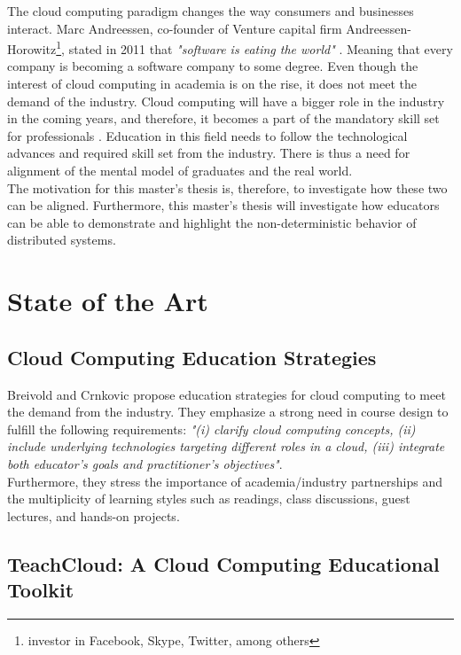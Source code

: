 The cloud computing paradigm changes the way consumers and businesses interact. Marc Andreessen, co-founder of Venture capital firm Andreessen-Horowitz\footnote{investor in Facebook, Skype, Twitter, among others}, stated in 2011 that \textit{"software is eating the world"} \cite{andreessen2011eating}. Meaning that every company is becoming a software company to some degree. Even though the interest of cloud computing in academia is on the rise, it does not meet the demand of the industry. Cloud computing will have a bigger role in the industry in the coming years, and therefore, it becomes a part of the mandatory skill set for professionals \cite[p. 30]{breivold2014education_strategies}.
Education in this field needs to follow the technological advances and required skill set from the industry. There is thus a need for alignment of the mental model of graduates and the real world. \\

\noindent
The motivation for this master's thesis is, therefore, to investigate how these two can be aligned. Furthermore, this master's thesis will investigate how educators can be able to demonstrate and highlight the non-deterministic behavior of distributed systems.


\section{State of the Art}
\label{sec:sota}

\subsection*{Cloud Computing Education Strategies \cite{breivold2014education_strategies}}
Breivold and Crnkovic propose education strategies for cloud computing to meet the demand from the industry. They emphasize a strong need in course design to fulfill the following requirements: \textit{"(i) clarify cloud computing concepts, (ii) include underlying technologies targeting different roles in a cloud,  (iii) integrate both educator's goals and practitioner's objectives"}. \\

\noindent
Furthermore, they stress the importance of academia/industry partnerships and the multiplicity of learning styles such as readings, class discussions, guest lectures, and hands-on projects.

\subsection*{TeachCloud: A Cloud Computing Educational Toolkit \cite{jararweh2013teachcloud}}

